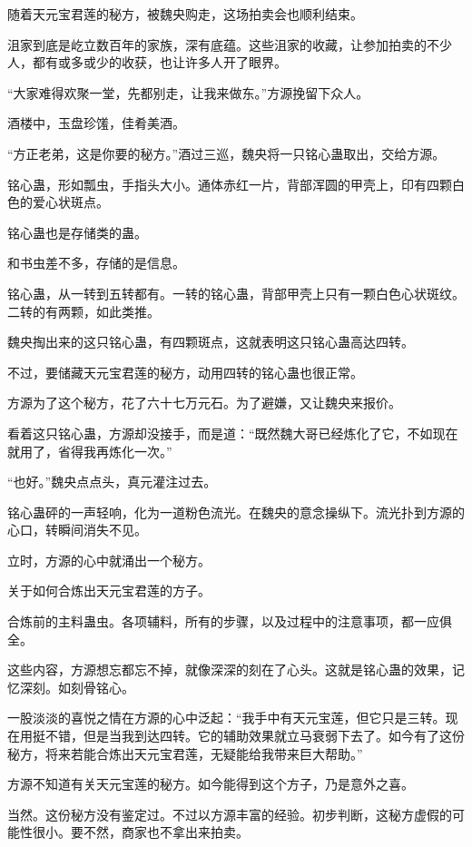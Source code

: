 
\begin{this_body}

随着天元宝君莲的秘方，被魏央购走，这场拍卖会也顺利结束。

沮家到底是屹立数百年的家族，深有底蕴。这些沮家的收藏，让参加拍卖的不少人，都有或多或少的收获，也让许多人开了眼界。

“大家难得欢聚一堂，先都别走，让我来做东。”方源挽留下众人。

酒楼中，玉盘珍馐，佳肴美酒。

“方正老弟，这是你要的秘方。”酒过三巡，魏央将一只铭心蛊取出，交给方源。

铭心蛊，形如瓢虫，手指头大小。通体赤红一片，背部浑圆的甲壳上，印有四颗白色的爱心状斑点。

铭心蛊也是存储类的蛊。

和书虫差不多，存储的是信息。

铭心蛊，从一转到五转都有。一转的铭心蛊，背部甲壳上只有一颗白色心状斑纹。二转的有两颗，如此类推。

魏央掏出来的这只铭心蛊，有四颗斑点，这就表明这只铭心蛊高达四转。

不过，要储藏天元宝君莲的秘方，动用四转的铭心蛊也很正常。

方源为了这个秘方，花了六十七万元石。为了避嫌，又让魏央来报价。

看着这只铭心蛊，方源却没接手，而是道：“既然魏大哥已经炼化了它，不如现在就用了，省得我再炼化一次。”

“也好。”魏央点点头，真元灌注过去。

铭心蛊砰的一声轻响，化为一道粉色流光。在魏央的意念操纵下。流光扑到方源的心口，转瞬间消失不见。

立时，方源的心中就涌出一个秘方。

关于如何合炼出天元宝君莲的方子。

合炼前的主料蛊虫。各项辅料，所有的步骤，以及过程中的注意事项，都一应俱全。

这些内容，方源想忘都忘不掉，就像深深的刻在了心头。这就是铭心蛊的效果，记忆深刻。如刻骨铭心。

一股淡淡的喜悦之情在方源的心中泛起：“我手中有天元宝莲，但它只是三转。现在用挺不错，但是当我到达四转。它的辅助效果就立马衰弱下去了。如今有了这份秘方，将来若能合炼出天元宝君莲，无疑能给我带来巨大帮助。”

方源不知道有关天元宝莲的秘方。如今能得到这个方子，乃是意外之喜。

当然。这份秘方没有鉴定过。不过以方源丰富的经验。初步判断，这秘方虚假的可能性很小。要不然，商家也不拿出来拍卖。


\end{this_body}
